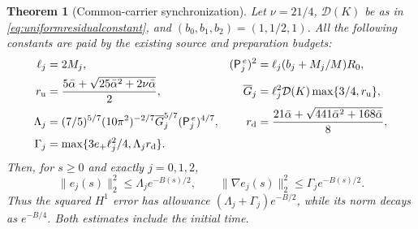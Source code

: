 \documentclass[11pt]{article}
\numberwithin{equation}{section}
\newtheorem{theorem}{Theorem}[section]
\begin{document}
\begin{theorem}[Common-carrier synchronization]\label{thm:commoncarrier}
Let $\nu=21/4$, $\mathcal D(K)$ be as in
\eqref{eq:uniformresidualconstant}, and $(b_0,b_1,b_2)=(1,1/2,1)$.
All the following constants are paid by the existing source and
preparation budgets:
\begin{align}
 \ell_j&=2M_j,&
 (\mathsf P_j^{\,e})^2&=\ell_j(b_j+M_j/M)R_0,\nonumber\\
 r_{\rm u}&=\frac{5\bar\alpha+
           \sqrt{25\bar\alpha^2+2\nu\bar\alpha}}2,&
 \overline G_j&=\ell_j^2\mathcal D(K)\max\{3/4,r_{\rm u}\},
 \label{eq:commoncarrierinitial}\\
 \Lambda_j&=(7/5)^{5/7}(10\pi^2)^{-2/7}
               \overline G_j^{5/7}(\mathsf P_j^{\,e})^{4/7},&
 r_{\rm d}&=\frac{21\bar\alpha+
                \sqrt{441\bar\alpha^2+168\bar\alpha}}8,\nonumber\\
 \Gamma_j&=\max\{3e_+\ell_j^2/4,\Lambda_jr_{\rm d}\}.
 \label{eq:commoncarrierconstants}
\end{align}
Then, for $s\ge0$ and exactly $j=0,1,2$,
\begin{equation}\label{eq:commoncarrierdecay}
 \|e_j(s)\|_2^2\le\Lambda_je^{-B(s)/2},\qquad
 \|\nabla e_j(s)\|_2^2\le\Gamma_je^{-B(s)/2}.
\end{equation}
Thus the squared $H^1$ error has allowance
$(\Lambda_j+\Gamma_j)e^{-B/2}$, while its norm decays as $e^{-B/4}$.
Both estimates include the initial time.
\end{theorem}
\end{document}
